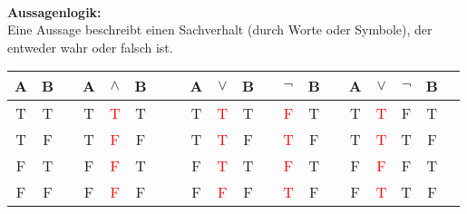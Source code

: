 \begin{multicols}{3}
    \\
    \textbf{Aussagenlogik:}\\
    Eine Aussage beschreibt einen Sachverhalt (durch Worte oder Symbole), der
    entweder wahr oder falsch ist.\\

    \scriptsize
    \begin{tabular}{@{ }c@{ }@{ }c | c@{ }@{ }c@{ }@{ }c@{ }@{ }c@{ }@{ }c | c@{ }@{ }c@{ }@{ }c@{ }@{ }c@{ }@{ }c | c@{ }@{ }c | c@{ }@{ }c@{ }@{ }c@{ }@{ }c@{ }@{ }c@{ }@{ }c}
        A & B &  & A & $\land$            & B &  &  & A & $\lor$             & B &  & $\lnot$            & B &  & A & $\lor$             & $\lnot$ & B & \\
        \hline
        T & T &  & T & \textcolor{red}{T} & T &  &  & T & \textcolor{red}{T} & T &  & \textcolor{red}{F} & T &  & T & \textcolor{red}{T} & F       & T & \\
        T & F &  & T & \textcolor{red}{F} & F &  &  & T & \textcolor{red}{T} & F &  & \textcolor{red}{T} & F &  & T & \textcolor{red}{T} & T       & F & \\
        F & T &  & F & \textcolor{red}{F} & T &  &  & F & \textcolor{red}{T} & T &  & \textcolor{red}{F} & T &  & F & \textcolor{red}{F} & F       & T & \\
        F & F &  & F & \textcolor{red}{F} & F &  &  & F & \textcolor{red}{F} & F &  & \textcolor{red}{T} & F &  & F & \textcolor{red}{T} & T       & F & \\
    \end{tabular}
    \normalsize


\end{multicols}
